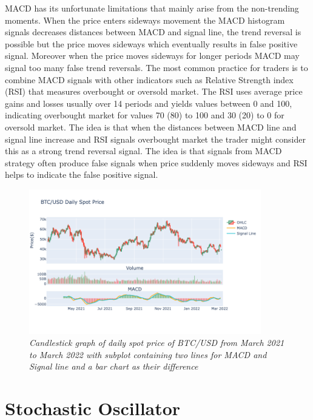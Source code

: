 MACD has its unfortunate limitations that mainly arise from the non-trending moments. When the price enters sideways movement the MACD histogram signals decreases distances between MACD and signal line, the trend reversal is possible but the price moves sideways which eventually results in false positive signal. Moreover when the price moves sideways for longer periods MACD may signal too many false trend reversals. The most common practice for traders is to combine MACD signals with other indicators such as Relative Strength index (RSI) that measures overbought or oversold market. The RSI uses average price gains and losses usually over 14 periods and yields values between 0 and 100, indicating overbought market for values 70 (80) to 100 and 30 (20) to 0 for oversold market. The idea is that when the distances between MACD line and signal line increase and RSI signals overbought market the trader might consider this as a strong trend reversal signal. The idea is that signals from MACD strategy often produce false signals when price suddenly moves sideways and RSI helps to indicate the false positive signal. 

\begin{figure}[h]

\begin{center}
	\includegraphics[width=0.9\textwidth]{MACD.png}
\end{center}

\caption{\textit{ Candlestick graph of daily spot price of BTC/USD from March 2021 to March 2022 with subplot containing two lines for MACD and Signal line and a bar chart as their difference}}

\end{figure}

\section{Stochastic Oscillator}

